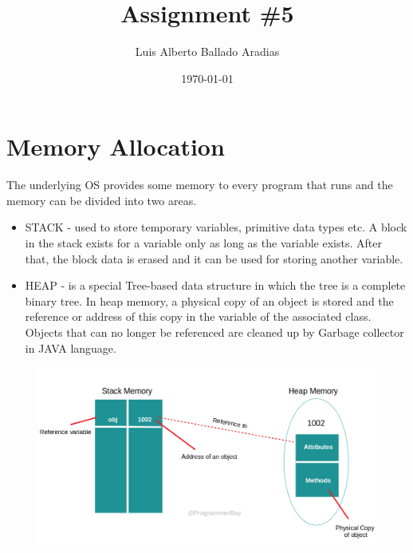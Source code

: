 \documentclass[
	12pt, %
]{fphw}
\title{Assignment \#5} %
\author{Luis Alberto Ballado Aradias} %
\date{\today} %
\institute{Centro de Investigación y de Estudios Avanzados del IPN \\ Unidad Tamaulipas} %
\begin{document}
\maketitle %


\section*{{\color{Apricot}Memory Allocation}}

The underlying OS provides some memory to every program that runs and the memory can be divided into two areas.

\begin{itemize}
\item STACK - used to store temporary variables, primitive data types etc. A block in the stack exists for a variable only as long as the variable exists. After that, the block data is erased and it can be used for storing another variable.
\item HEAP - is a special Tree-based data structure in which the tree is a complete binary tree. In heap memory, a physical copy of an object is stored and the reference or address of this copy in the variable of the associated class. Objects that can no longer be referenced are cleaned up by Garbage collector in JAVA language.
\end{itemize}

\begin{figure}[H]
  \centering
  \includegraphics[scale=0.4]{images/object_mem.png}
\end{figure}
\end{document}
